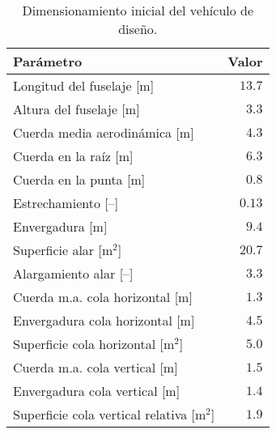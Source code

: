 \begin{table}[ht]
\centering
\caption{Dimensionamiento inicial del vehículo de diseño.}
\label{tab:dimdis}
\begin{tabular}{lr}
\toprule
Parámetro                                   & Valor      \\ \midrule
Longitud del fuselaje [m]                   & $13.7$      \\
Altura del fuselaje [m]                     & $3.3$      \\ \midrule
Cuerda media aerodinámica [m]               & $4.3$      \\
Cuerda en la raíz [m]                       & $6.3$      \\
Cuerda en la punta [m]                      & $0.8$      \\
Estrechamiento [–]                          & $0.13$      \\
Envergadura [m]                             & $9.4$      \\
Superficie alar [m$^2$]                     & $20.7$     \\
Alargamiento alar [–]                       & $3.3$      \\ \midrule
Cuerda m.a. cola horizontal [m]             & $1.3$      \\
Envergadura cola horizontal [m]             & $4.5$      \\
Superficie cola horizontal [m$^2$]          & $5.0$      \\ \midrule
Cuerda m.a. cola vertical [m]               & $1.5$      \\
Envergadura cola vertical [m]               & $1.4$      \\
Superficie cola vertical relativa [m$^2$]   & $1.9$      \\ \bottomrule
\end{tabular}
\end{table}
